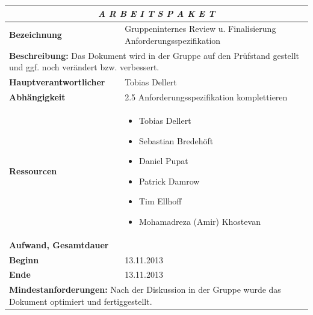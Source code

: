 \documentclass[fontsize=12pt,paper=a4,twoside]{scrartcl}
\begin{document}
\begin{tabular}{p{7.5cm}|p{7.5cm}}\toprule
\multicolumn{2}{c}{\textbf{\textit{A R B E I T S P A K E T \quad 2.7}}} \\ \toprule \hline
\textbf{Bezeichnung} & Gruppeninternes Review u. Finalisierung Anforderungsspezifikation\\\hline
\multicolumn{2}{p{15cm}}{\textbf{Beschreibung:} \newline 
Das Dokument wird in der Gruppe auf den Prüfstand gestellt und ggf. noch verändert bzw. verbessert.}  \\\hline
\textbf{Hauptverantwortlicher} & Tobias Dellert \\\hline
\textbf{Abhängigkeit} & 2.5 Anforderungsspezifikation komplettieren\\\hline
\textbf{Ressourcen} & \begin{itemize} 
\itemsep0pt
\item Tobias Dellert
\item Sebastian Bredehöft
\item Daniel Pupat
\item Patrick Damrow
\item Tim Ellhoff
\item Mohamadreza (Amir) Khostevan
\end{itemize} \\\hline
\textbf{Aufwand, Gesamtdauer} & \\\hline
\textbf{Beginn} & 13.11.2013 \\\hline
\textbf{Ende} & 13.11.2013\\\hline
\multicolumn{2}{p{15cm}}{\textbf{Mindestanforderungen: } \newline
Nach der Diskussion in der Gruppe wurde das Dokument optimiert und fertiggestellt. }  \\ \toprule
\end{tabular} \\\\
\end{document}
